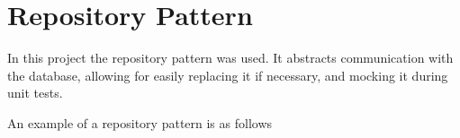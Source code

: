 \section{Repository Pattern}
In this project the repository pattern was used.
It abstracts communication with the database, allowing for easily replacing it if necessary, and mocking it during unit tests.

An example of a repository pattern is as follows

